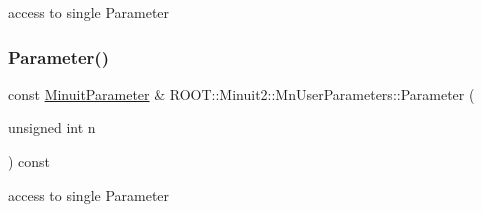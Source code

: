 access to single Parameter 

\mbox{\label{classROOT_1_1Minuit2_1_1MnUserParameters_a12ee4c4660c21a660fb5f9d1f30b2fc2}} 
\subsubsection{\texorpdfstring{Parameter()}{Parameter()}\hspace{0.1cm}{\footnotesize\ttfamily [2/2]}}
{\footnotesize\ttfamily const \mbox{\hyperlink{classROOT_1_1Minuit2_1_1MinuitParameter}{Minuit\+Parameter}} \& R\+O\+O\+T\+::\+Minuit2\+::\+Mn\+User\+Parameters\+::\+Parameter (\begin{DoxyParamCaption}\item[{unsigned int}]{n }\end{DoxyParamCaption}) const}



access to single Parameter 

